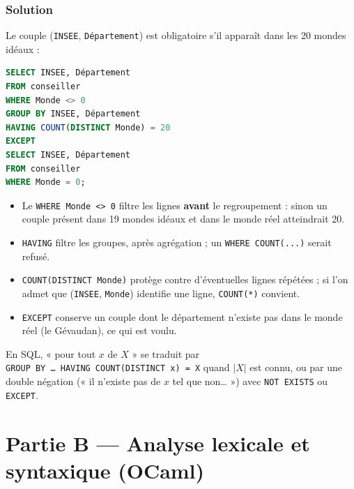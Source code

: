 \documentclass[11pt,a4paper]{article}
\providecommand{\tightlist}{\setlength{\itemsep}{0pt}\setlength{\parskip}{0pt}}
\begin{document}
\hypertarget{solution-4}{%
\subsubsection{Solution}\label{solution-4}}

Le couple (\texttt{INSEE}, \texttt{Département}) est obligatoire s'il apparaît dans les 20 mondes idéaux :

\begin{lstlisting}[language=SQL]
SELECT INSEE, Département
FROM conseiller
WHERE Monde <> 0
GROUP BY INSEE, Département
HAVING COUNT(DISTINCT Monde) = 20
EXCEPT
SELECT INSEE, Département
FROM conseiller
WHERE Monde = 0;
\end{lstlisting}

\begin{itemize}
\tightlist
\item
  Le \texttt{WHERE\ Monde\ \textless{}\textgreater{}\ 0} filtre les lignes \textbf{avant} le regroupement : sinon un couple présent dans 19 mondes idéaux et dans le monde réel atteindrait 20.
\item
  \texttt{HAVING} filtre les groupes, après agrégation ; un \texttt{WHERE\ COUNT(...)} serait refusé.
\item
  \texttt{COUNT(\allowbreak{}DISTINCT\ Monde)\allowbreak{}} protège contre d'éventuelles lignes répétées ; si l'on admet que (\texttt{INSEE}, \texttt{Monde}) identifie une ligne, \texttt{COUNT(*)} convient.
\item
  \texttt{EXCEPT} conserve un couple dont le département n'existe pas dans le monde réel (le Gévaudan), ce qui est voulu.
\end{itemize}

\begin{methode}

En SQL, « pour tout \(x\) de \(X\) » se traduit par \texttt{GROUP\ BY\ …\ HAVING\ COUNT(\allowbreak{}DISTINCT\ x)\allowbreak{}\ =\allowbreak{}\ \textbar{}X\textbar{}} quand \(|X|\) est connu, ou par une double négation (« il n'existe pas de \(x\) tel que non\ldots{} ») avec \texttt{NOT\ EXISTS} ou \texttt{EXCEPT}.

\end{methode}

\hypertarget{partie-b-analyse-lexicale-et-syntaxique-ocaml}{%
\section{Partie B --- Analyse lexicale et syntaxique (OCaml)}\label{partie-b-analyse-lexicale-et-syntaxique-ocaml}}
\end{document}
